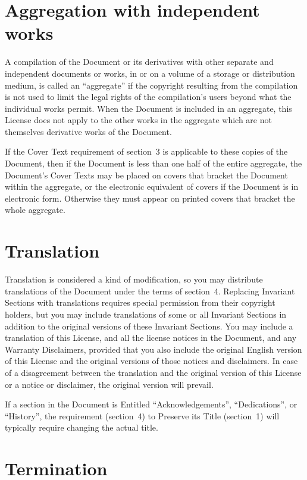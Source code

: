 \section{Aggregation with independent works}

A compilation of the Document or its derivatives with other separate
and independent documents or works, in or on a volume of a storage or
distribution medium, is called an ``aggregate'' if the copyright
resulting from the compilation is not used to limit the legal rights
of the compilation's users beyond what the individual works permit.
When the Document is included in an aggregate, this License does not
apply to the other works in the aggregate which are not themselves
derivative works of the Document.

If the Cover Text requirement of section~3 is applicable to these
copies of the Document, then if the Document is less than one half of
the entire aggregate, the Document's Cover Texts may be placed on
covers that bracket the Document within the aggregate, or the
electronic equivalent of covers if the Document is in electronic form.
Otherwise they must appear on printed covers that bracket the whole
aggregate.


\section{Translation}

Translation is considered a kind of modification, so you may
distribute translations of the Document under the terms of section~4.
Replacing Invariant Sections with translations requires special
permission from their copyright holders, but you may include
translations of some or all Invariant Sections in addition to the
original versions of these Invariant Sections.  You may include a
translation of this License, and all the license notices in the
Document, and any Warranty Disclaimers, provided that you also include
the original English version of this License and the original versions
of those notices and disclaimers.  In case of a disagreement between
the translation and the original version of this License or a notice
or disclaimer, the original version will prevail.

If a section in the Document is Entitled ``Acknowledgements'',
``Dedications'', or ``History'', the requirement (section~4) to Preserve
its Title (section~1) will typically require changing the actual
title.


\section{Termination}

